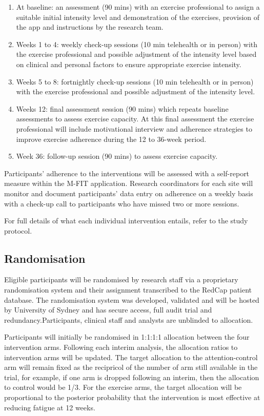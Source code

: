 \documentclass[11pt,parskip=half-]{scrartcl}
\begin{document}
\begin{enumerate}
  \def\labelenumi{\arabic{enumi}.}
  \item At baseline: an assessment (90 mins) with an exercise professional to assign a suitable initial intensity level and demonstration of the exercises, provision of the app and instructions by the research team.
  \item Weeks 1 to 4: weekly check-up sessions (10 min telehealth or in person) with the exercise professional and possible adjustment of the intensity level based on clinical and personal factors to ensure appropriate exercise intensity.
  \item Weeks 5 to 8: fortnightly check-up sessions (10 min telehealth or in person) with the exercise professional and possible adjustment of the intensity level.
  \item Weeks 12: final assessment session (90 mins) which repeats baseline assessments to assess exercise capacity. At this final assessment the exercise professional will include motivational interview and adherence strategies to improve exercise adherence during the 12 to 36-week period.
  \item Week 36: follow-up session (90 mins) to assess exercise capacity.
\end{enumerate}

Participants' adherence to the interventions will be assessed with a self-report measure within the M-FIT application. Research coordinators for each site will monitor and document participants' data entry on adherence on a weekly basis with a check-up call to participants who have missed two or more sessions.

For full details of what each individual intervention entails, refer to the study protocol.

\subsection{Randomisation}\label{randomisation}

Eligible participants will be randomised by research staff via a proprietary randomisation system and their assignment transcribed to the RedCap patient database. The randomisation system was developed, validated and will be hosted by University of Sydney and has secure access, full audit trial and redundancy.Participants, clinical staff and analysts are unblinded to allocation.

Participants will initially be randomised in 1:1:1:1 allocation between the four intervention arms. Following each interim analysis, the allocation ratios to intervention arms will be updated. The target allocation to the attention-control arm will remain fixed as the recipricol of the number of arm still available in the trial, for example, if one arm is dropped following an interim, then the allocation to control would be 1/3. For the exercise arms, the target allocation will be proportional to the posterior probability that the intervention is most effective at reducing fatigue at 12 weeks.
\end{document}
